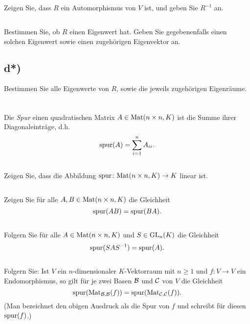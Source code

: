\documentclass[a4paper,9pt]{extarticle}
\begin{document}
\subsection{}
Zeigen Sie, dass $R$ ein Automorphismus von $V$ ist, und geben Sie $R^{-1}$ an.

\subsection{}
Bestimmen Sie, ob $R$ einen Eigenwert hat. Geben Sie gegebenenfalls einen solchen Eigenwert sowie einen zugehörigen Eigenvektor an.

\subsection*{d*)}
Bestimmen Sie alle Eigenwerte von $R$, sowie die jeweils zugehörigen Eigenräume.





\section{}
Die \emph{Spur} einen quadratischen Matrix $A \in \mathrm{Mat}(n \times n, K)$ ist die Summe ihrer Diagonaleinträge, d.h.
\[
 \mathrm{spur}(A) = \sum_{i=1}^n A_{ii}.
\]

\subsection{}
Zeigen Sie, dass die Abbildung $\mathrm{spur} \colon \mathrm{Mat}(n \times n, K) \to K$ linear ist.

\subsection{}
Zeigen Sie für alle $A, B \in \mathrm{Mat}(n \times n, K)$ die Gleichheit
\[
 \mathrm{spur}(AB) = \mathrm{spur}(BA).
\]

\subsection{}
Folgern Sie für alle $A \in \mathrm{Mat}(n \times n, K)$ und $S \in \mathrm{GL}_n(K)$ die Gleichheit
\[
 \mathrm{spur}(SAS^{-1}) = \mathrm{spur}(A).
\]

\subsection{}
Folgern Sie: Ist $V$ ein $n$-dimensionaler $K$-Vektorraum mit $n \geq 1$ und $f \colon V \to V$ ein Endomorphismus, so gilt für je zwei Basen $\mathcal{B}$ und $\mathcal{C}$ von $V$ die Gleichheit
\[
 \mathrm{spur}(\mathrm{Mat}_{\mathcal{B},\mathcal{B}}(f)) = \mathrm{spur}(\mathrm{Mat}_{\mathcal{C},\mathcal{C}}(f)).
\]
(Man bezeichnet den obigen Ausdruck als die Spur von $f$ und schreibt für diesen $\mathrm{spur}(f)$.)
\end{document}
